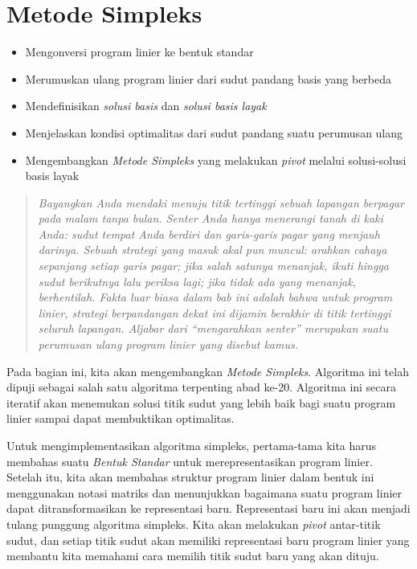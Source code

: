\chapter{Metode Simpleks}
\label{ch:simplex-dictionary}
\begin{outcome}
\begin{itemize}
\item Mengonversi program linier ke bentuk standar
\item Merumuskan ulang program linier dari sudut pandang basis yang berbeda
\item Mendefinisikan \emph{solusi basis} dan \emph{solusi basis layak}
\item Menjelaskan kondisi optimalitas dari sudut pandang suatu perumusan ulang
\item Mengembangkan \emph{Metode Simpleks} yang melakukan \emph{pivot} melalui solusi-solusi basis layak
\end{itemize}
\end{outcome}

\begin{quote}
\itshape Bayangkan Anda mendaki menuju titik tertinggi sebuah lapangan berpagar pada malam tanpa bulan. Senter Anda hanya menerangi tanah di kaki Anda: sudut tempat Anda berdiri dan garis-garis pagar yang menjauh darinya. Sebuah strategi yang masuk akal pun muncul: arahkan cahaya sepanjang setiap garis pagar; jika salah satunya menanjak, ikuti hingga sudut berikutnya lalu periksa lagi; jika tidak ada yang menanjak, berhentilah. Fakta luar biasa dalam bab ini adalah bahwa untuk program linier, strategi berpandangan dekat ini dijamin berakhir di titik tertinggi seluruh lapangan. Aljabar dari ``mengarahkan senter'' merupakan suatu perumusan ulang program linier yang disebut \emph{kamus}.
\end{quote}

Pada bagian ini, kita akan mengembangkan \emph{Metode Simpleks}. Algoritma ini telah dipuji sebagai salah satu algoritma terpenting abad ke-20. Algoritma ini secara iteratif akan menemukan solusi titik sudut yang lebih baik bagi suatu program linier sampai dapat membuktikan optimalitas.

Untuk mengimplementasikan algoritma simpleks, pertama-tama kita harus membahas suatu \emph{Bentuk Standar} untuk merepresentasikan program linier. Setelah itu, kita akan membahas struktur program linier dalam bentuk ini menggunakan notasi matriks dan menunjukkan bagaimana suatu program linier dapat ditransformasikan ke representasi baru. Representasi baru ini akan menjadi tulang punggung algoritma simpleks. Kita akan melakukan \emph{pivot} antar-titik sudut, dan setiap titik sudut akan memiliki representasi baru program linier yang membantu kita memahami cara memilih titik sudut baru yang akan dituju.

